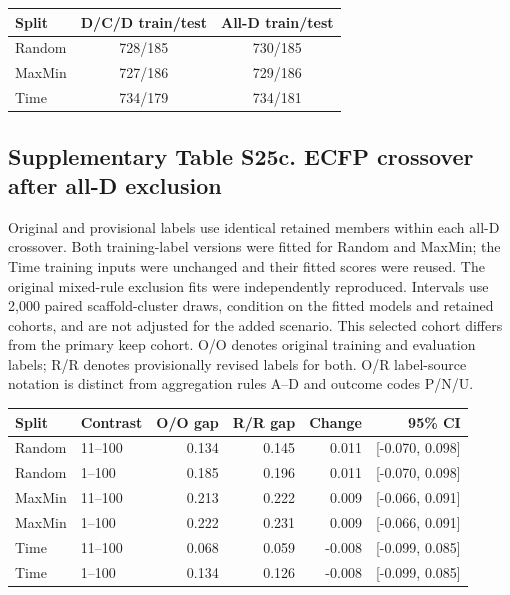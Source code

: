 \begin{center}
\small
\begin{tabular}{lcc}
\toprule
Split & D/C/D train/test & All-D train/test \\
\midrule
Random & 728/185 & 730/185 \\
MaxMin & 727/186 & 729/186 \\
Time & 734/179 & 734/181 \\
\bottomrule
\end{tabular}
\end{center}

\subsection*{Supplementary Table S25c. ECFP crossover after all-D exclusion}

Original and provisional labels use identical retained members within
each all-D crossover. Both training-label versions were fitted for Random and
MaxMin; the Time training inputs were unchanged and their fitted scores were
reused. The original mixed-rule exclusion fits were independently reproduced.
Intervals use 2,000 paired scaffold-cluster draws, condition on the fitted models
and retained cohorts, and are not adjusted for the added scenario. This selected
cohort differs from the primary keep cohort. O/O denotes original training and
evaluation labels; R/R denotes provisionally revised labels for both. O/R label-source
notation is distinct from aggregation rules A--D and outcome codes P/N/U.

\begin{center}
\small
\begin{tabular}{llrrrr}
\toprule
Split & Contrast & O/O gap & R/R gap & Change & 95\% CI \\
\midrule
Random & 11--100 & 0.134 & 0.145 & 0.011 & [-0.070, 0.098] \\
Random & 1--100 & 0.185 & 0.196 & 0.011 & [-0.070, 0.098] \\
MaxMin & 11--100 & 0.213 & 0.222 & 0.009 & [-0.066, 0.091] \\
MaxMin & 1--100 & 0.222 & 0.231 & 0.009 & [-0.066, 0.091] \\
Time & 11--100 & 0.068 & 0.059 & -0.008 & [-0.099, 0.085] \\
Time & 1--100 & 0.134 & 0.126 & -0.008 & [-0.099, 0.085] \\
\bottomrule
\end{tabular}
\end{center}

